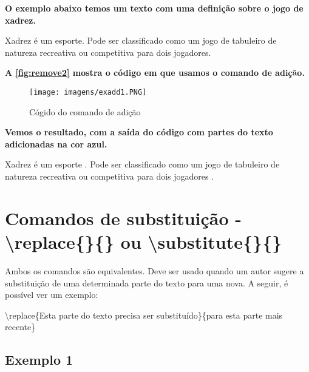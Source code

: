 \documentclass[12pt,openright,oneside,a4paper,sumario=tradicional,brazil]{abntex2}
\begin{document}
\textbf{O exemplo abaixo temos um texto com uma definição sobre o jogo de xadrez.}

\begin{center}
\justifying
Xadrez é um esporte. Pode ser classificado como um jogo de tabuleiro de natureza recreativa ou competitiva para dois jogadores.\\
\end{center}

\textbf{A \autoref{fig:remove2} mostra o código em que usamos o comando de adição.}

\begin{figure}[htp]
\caption{Cógido do comando de adição}
        \centering
        \texttt{[image: imagens/exadd1.PNG]}
\label{fig:remove2}
\end{figure}

\textbf{Vemos o resultado, com a saída do código com partes do texto adicionadas na cor azul.}

\begin{center}
    \justifying
    Xadrez é um esporte . Pode ser classificado como um jogo de tabuleiro de natureza recreativa ou competitiva para dois jogadores .
\end{center}

\section{Comandos de substituição - \textbackslash replace\{\}\{\} ou \textbackslash substitute\{\}\{\}}
Ambos os comandos são equivalentes. Deve ser usado quando um autor sugere a substituição de uma determinada parte do
texto para uma nova. A seguir, é possível ver um exemplo:\\

\begin{minipage}{0.45\textwidth}
\textbackslash replace\{Esta parte do texto precisa ser substituído\}\{para esta parte mais recente\}
\end{minipage}\hfill
\begin{minipage}{0.45\textwidth}
\end{minipage}

\subsection{Exemplo 1}
\end{document}
